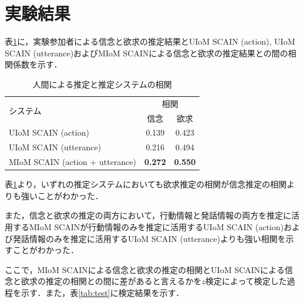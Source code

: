 \section{実験結果}

\par
表\ref{tab:cof}に，実験参加者による信念と欲求の推定結果とUIoM SCAIN (action), UIoM SCAIN (utterance)およびMIoM SCAINによる信念と欲求の推定結果との間の相関係数を示す．
\begin{table}[htb]
  \begin{center}
  \caption{人間による推定と推定システムの相関}
  \label{tab:cof}
  \begin{tabular}{lcc} \hline
    \multirow{2}{*}{システム}&\multicolumn{2}{c}{相関}\\\cline{2-3}
    & \hspace{10pt} 信念 \hspace{10pt} & \hspace{10pt} 欲求 \hspace{10pt} \\ \hline
    UIoM SCAIN (action)&0.139&0.423\\
    UIoM SCAIN (utterance)&0.216&0.494\\
    MIoM SCAIN (action + utterance)&\bf0.272&\bf0.550 \\\hline
  \end{tabular}
\end{center}
\end{table}


\par
表\ref{tab:cof}より，いずれの推定システムにおいても欲求推定の相関が信念推定の相関よりも強いことがわかった．

\par
また，信念と欲求の推定の両方において，行動情報と発話情報の両方を推定に活用するMIoM SCAINが行動情報のみを推定に活用するUIoM SCAIN (action)および発話情報のみを推定に活用するUIoM SCAIN (utterance)よりも強い相関を示すことがわかった．

\par
ここで，MIoM SCAINによる信念と欲求の推定の相関とUIoM SCAINによる信念と欲求の推定の相関との間に差があると言えるかを$z$検定\cite{alma9926301497204034}によって検定した過程を示す．また，表\ref{tab:test}に検定結果を示す．


